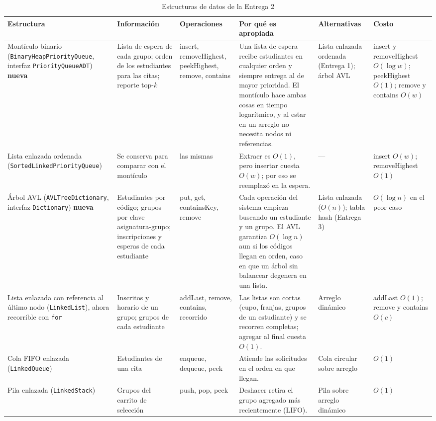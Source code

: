 \documentclass[conference]{IEEEtran}
\begin{document}
\begin{table}[htbp]
\caption{Estructuras de datos de la Entrega 2}
\label{tab:ed}
\centering
\footnotesize
\setlength{\tabcolsep}{3pt}
\begin{tabular}{@{}p{2.7cm} p{2.6cm} p{2.3cm} p{4.4cm} p{2.6cm} p{2.4cm}@{}}
\toprule
\textbf{Estructura} & \textbf{Información} & \textbf{Operaciones} & \textbf{Por qué es apropiada} & \textbf{Alternativas} & \textbf{Costo} \\
\midrule
Montículo binario (\texttt{BinaryHeap}\allowbreak\texttt{PriorityQueue}, interfaz \texttt{PriorityQueueADT}) \textbf{nueva} & Lista de espera de cada grupo; orden de los estudiantes para las citas; reporte top-$k$ & insert, removeHighest, peekHighest, remove, contains & Una lista de espera recibe estudiantes en cualquier orden y siempre entrega al de mayor prioridad. El montículo hace ambas cosas en tiempo logarítmico, y al estar en un arreglo no necesita nodos ni referencias. & Lista enlazada ordenada (Entrega 1); árbol AVL & insert y removeHighest $O(\log w)$; peekHighest $O(1)$; remove y contains $O(w)$ \\
Lista enlazada ordenada (\texttt{SortedLinked}\allowbreak\texttt{PriorityQueue}) & Se conserva para comparar con el montículo & las mismas & Extraer es $O(1)$, pero insertar cuesta $O(w)$; por eso se reemplazó en la espera. & --- & insert $O(w)$; removeHighest $O(1)$ \\
Árbol AVL (\texttt{AVLTreeDictionary}, interfaz \texttt{Dictionary}) \textbf{nueva} & Estudiantes por código; grupos por clave asignatura-grupo; inscripciones y esperas de cada estudiante & put, get, containsKey, remove & Cada operación del sistema empieza buscando un estudiante y un grupo. El AVL garantiza $O(\log n)$ aun si los códigos llegan en orden, caso en que un árbol sin balancear degenera en una lista. & Lista enlazada ($O(n)$); tabla hash (Entrega 3) & $O(\log n)$ en el peor caso \\
Lista enlazada con referencia al último nodo (\texttt{LinkedList}), ahora recorrible con \texttt{for} & Inscritos y horario de un grupo; grupos de cada estudiante & addLast, remove, contains, recorrido & Las listas son cortas (cupo, franjas, grupos de un estudiante) y se recorren completas; agregar al final cuesta $O(1)$. & Arreglo dinámico & addLast $O(1)$; remove y contains $O(c)$ \\
Cola FIFO enlazada (\texttt{LinkedQueue}) & Estudiantes de una cita & enqueue, dequeue, peek & Atiende las solicitudes en el orden en que llegan. & Cola circular sobre arreglo & $O(1)$ \\
Pila enlazada (\texttt{LinkedStack}) & Grupos del carrito de selección & push, pop, peek & Deshacer retira el grupo agregado más recientemente (LIFO). & Pila sobre arreglo dinámico & $O(1)$ \\
\bottomrule
\end{tabular}
\end{table}
\end{document}
